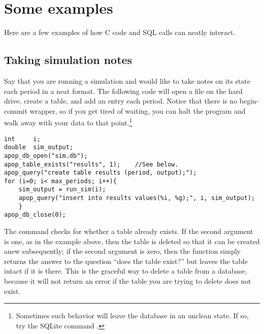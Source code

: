 
\section{Some examples} 
Here are a few examples of how C code and SQL calls can neatly interact.

\subsection{Taking simulation notes}\label{createeg}
Say that you are running a simulation and would like to take notes on
its state each period in a neat format. The following code will open a
file on the hard drive, create a table, and add an entry each period.
Notice that there is no begin-commit wrapper, so if you get tired of
waiting, you can halt the program and walk away with
your data to that point.\footnote{Sometimes such behavior will leave the database in
an unclean state. If so, try the SQLite command .}


\begin{lstlisting}
int     i;
double  sim_output;
apop_db_open("sim.db");
apop_table_exists("results", 1);    //See below.
apop_query("create table results (period, output);");
for (i=0; i< max_periods; i++){
    sim_output = run_sim(i);
    apop_query("insert into results values(%i, %g);", i, sim_output);
    }
apop_db_close(0);
\end{lstlisting}

The  command checks for whether a table
already exists. If the second argument is one, as in the example above,
then the table is deleted so that it can be created anew subsequently;
if the second argument is zero, then the function simply returns the
answer to the question ``does the table exist?'' but leaves the table
intact if it is there. This is the graceful way to delete a table from
a database, because it will not return an error if the table you are
trying to delete does not exist.


